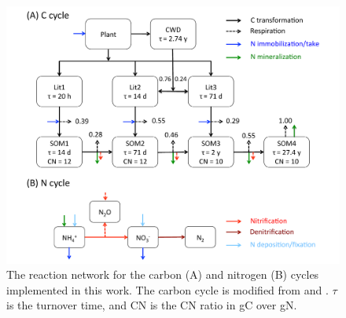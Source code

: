 \documentclass[gmd, manuscript]{copernicus}
\begin{document}






%

\clearpage
\begin{figure}[t]
\includegraphics[width=15cm]{../figs/fig01/fig01conceptualmodel.pdf}
\caption{The reaction network for the carbon (A) and nitrogen (B) cycles
implemented in this work. The carbon cycle is modified from
\citet{Thornton2005} and \citet{Bonan2012}. $\tau$ is the turnover time, and CN
is the CN ratio in gC over gN.}
\label{fig:conceptualmodel}
\end{figure}
\end{document}

